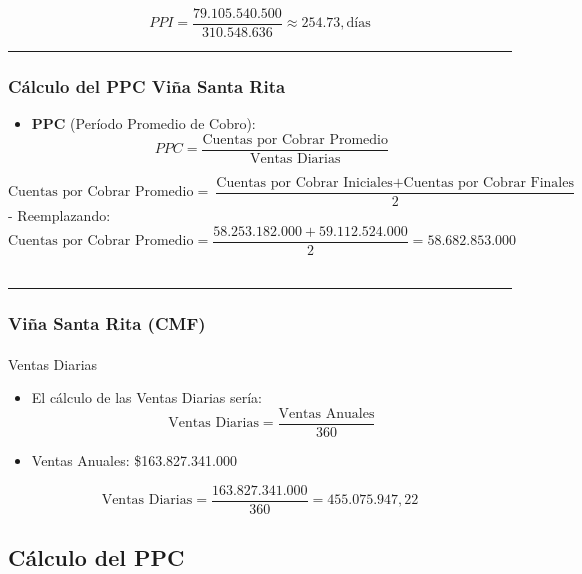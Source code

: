 \documentclass[
  letterpaper,
  DIV=11,
  numbers=noendperiod]{scrartcl}
\makeatletter
\let\oldparagraph\paragraph
\renewcommand{\paragraph}{
    \@ifstar
      \xxxParagraphStar
      \xxxParagraphNoStar
  }
\newcommand{\xxxParagraphStar}[1]{\oldparagraph*{#1}\mbox{}}
\newcommand{\xxxParagraphNoStar}[1]{\oldparagraph{#1}\mbox{}}
\providecommand{\tightlist}{%
  \setlength{\itemsep}{0pt}\setlength{\parskip}{0pt}}\usepackage{longtable,booktabs,array}
\makeatother
\begin{document}
\[
PPI = \frac{79.105.540.500}{310.548.636} \approx 254.73 , \text{días}
\]

\begin{center}\rule{0.5\linewidth}{0.5pt}\end{center}

\subsubsection{Cálculo del PPC Viña Santa
Rita}\label{cuxe1lculo-del-ppc-viuxf1a-santa-rita}

\begin{itemize}
\tightlist
\item
  \textbf{PPC} (Período Promedio de Cobro): \[ 
  PPC = \frac{\text{Cuentas por Cobrar Promedio}}{\text{Ventas Diarias}} 
  \]
\end{itemize}

\[
\text{Cuentas por Cobrar Promedio} = \frac{\text{Cuentas por Cobrar Iniciales} + \text{Cuentas por Cobrar Finales}}{2}
\] - Reemplazando: \[
\text{Cuentas por Cobrar Promedio} = \frac{58.253.182.000 + 59.112.524.000}{2} = 58.682.853.000
\]~

\begin{center}\rule{0.5\linewidth}{0.5pt}\end{center}

\subsubsection{Viña Santa Rita (CMF)}\label{viuxf1a-santa-rita-cmf-3}

\paragraph{Ventas Diarias}\label{ventas-diarias}

\begin{itemize}
\item
  El cálculo de las Ventas Diarias sería: \[
  \text{Ventas Diarias} = \frac{\text{Ventas Anuales}}{360}
  \]
\item
  Ventas Anuales: \$163.827.341.000
\end{itemize}

\[
\text{Ventas Diarias} = \frac{163.827.341.000}{360} = 455.075.947,22
\]

\subsection{Cálculo del PPC}\label{cuxe1lculo-del-ppc}
\end{document}
